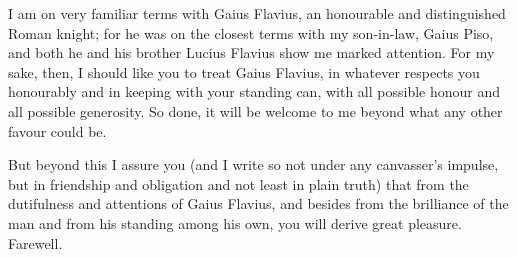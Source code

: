

 I am on very familiar terms with Gaius Flavius, an honourable and distinguished Roman knight; for he was on the closest terms with my son-in-law, Gaius Piso, and both he and his brother Lucius Flavius show me marked attention. For my sake, then, I should like you to treat Gaius Flavius, in whatever respects you honourably and in keeping with your standing can, with all possible honour and all possible generosity. So done, it will be welcome to me beyond what any other favour could be.

 But beyond this I assure you (and I write so not under any canvasser's impulse, but in friendship and obligation and not least in plain truth) that from the dutifulness and attentions of Gaius Flavius, and besides from the brilliance of the man and from his standing among his own, you will derive great pleasure. Farewell.
